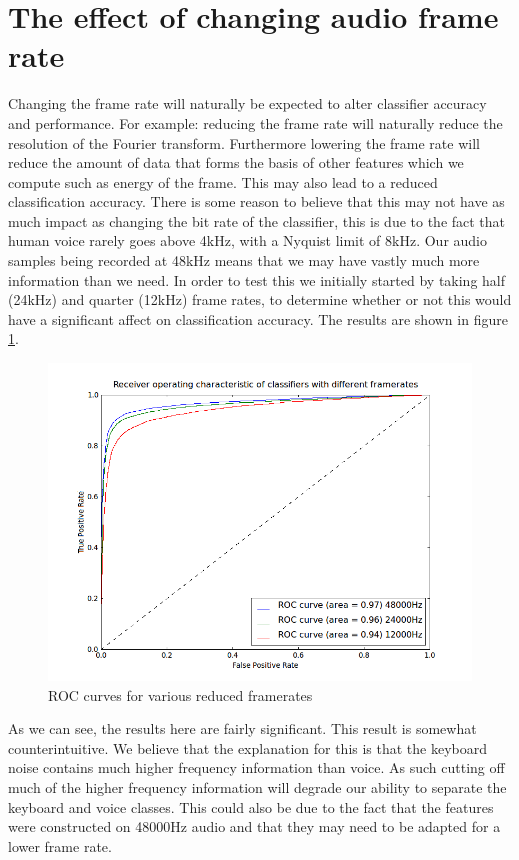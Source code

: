 \documentclass[ %
                    author={Sam Phippen},
                supervisor={Dr. Rafal Bogacz},
                     title={Real time voice activity detectors in noisy personal computing environments},
                  subtitle={},
                    degree={MEng},
                      year={2012} ]{thesis}
\begin{document}
\section{The effect of changing audio frame rate}

Changing the frame rate will naturally be expected to alter classifier accuracy
and performance. For example: reducing the frame rate will naturally reduce the
resolution of the Fourier transform. Furthermore lowering the frame rate will
reduce the amount of data that forms the basis of other features which we
compute such as energy of the frame. This may also lead to a reduced
classification accuracy. There is some reason to believe that this may not have
as much impact as changing the bit rate of the classifier, this is due to the
fact that human voice rarely goes above 4kHz, with a Nyquist limit of 8kHz. Our
audio samples being recorded at 48kHz means that we may have vastly much more
information than we need. In order to test this we initially started by taking
half (24kHz) and quarter (12kHz) frame rates, to determine whether or not this
would have a significant affect on classification accuracy. The results are
shown in figure \ref{fig:roc-frameratecrush}.

\begin{figure}
    \includegraphics[width=15cm]{roc_framerates.png}
    \caption{ROC curves for various reduced framerates}
    \label{fig:roc-frameratecrush}
\end{figure}

As we can see, the results here are fairly significant. This result is somewhat
counterintuitive. We believe that the explanation for this is that the keyboard
noise contains much higher frequency information than voice. As such cutting
off much of the higher frequency information will degrade our ability to
separate the keyboard and voice classes. This could also be due to the fact
that the features were constructed on 48000Hz audio and that they may need to
be adapted for a lower frame rate.
\end{document}

